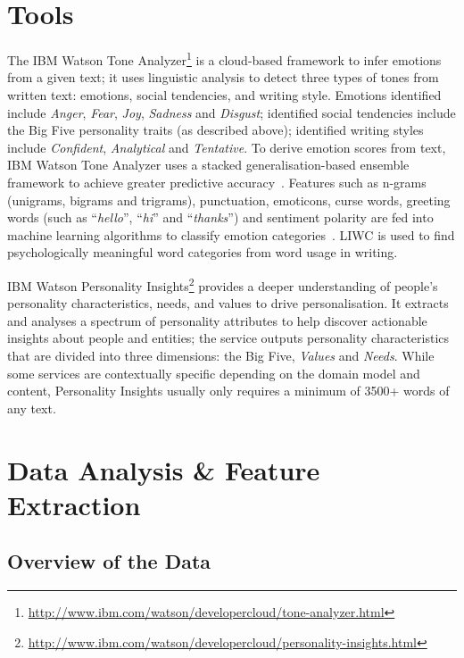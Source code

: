\documentclass[graybox]{svmult}
\begin{document}
\section{Tools}\label{tools}

The IBM Watson Tone
Analyzer\footnote{\url{http://www.ibm.com/watson/developercloud/tone-analyzer.html}}
is a cloud-based framework to infer emotions from a given text; it
uses linguistic analysis to detect three types of tones from written
text: emotions, social tendencies, and writing style. Emotions
identified include {\emph{Anger}}, {\emph{Fear}}, {\emph{Joy}},
{\emph{Sadness}} and {\emph{Disgust}}; identified social tendencies
include the Big Five personality traits (as described above);
identified writing styles include {\emph{Confident}},
{\emph{Analytical}} and {\emph{Tentative}}. To derive emotion scores
from text, IBM Watson Tone Analyzer uses a stacked
generalisation-based ensemble framework to achieve greater predictive
accuracy~\citep{costa+mccrae:1992}.  Features such as n-grams
(unigrams, bigrams and trigrams), punctuation, emoticons, curse words,
greeting words (such as ``{\emph{hello}}'', ``{\emph{hi}}'' and
``{\emph{thanks}}'') and sentiment polarity are fed into machine
learning algorithms to classify emotion
categories~\citep{fellbaum:2006}. LIWC is used to find psychologically
meaningful word categories from word usage in writing.

IBM Watson Personality
Insights\footnote{\url{http://www.ibm.com/watson/developercloud/personality-insights.html}}
provides a deeper understanding of people's personality
characteristics, needs, and values to drive personalisation. It
extracts and analyses a spectrum of personality attributes to help
discover actionable insights about people and entities; the service
outputs personality characteristics that are divided into three
dimensions: the Big Five, {\emph{Values}} and {\emph{Needs}}. While
some services are contextually specific depending on the domain model
and content, Personality Insights usually only requires a minimum of
3500+ words of any text.


\section{Data Analysis \& Feature Extraction}\label{dataanalysis}

\subsection{Overview of the Data}
\end{document}
